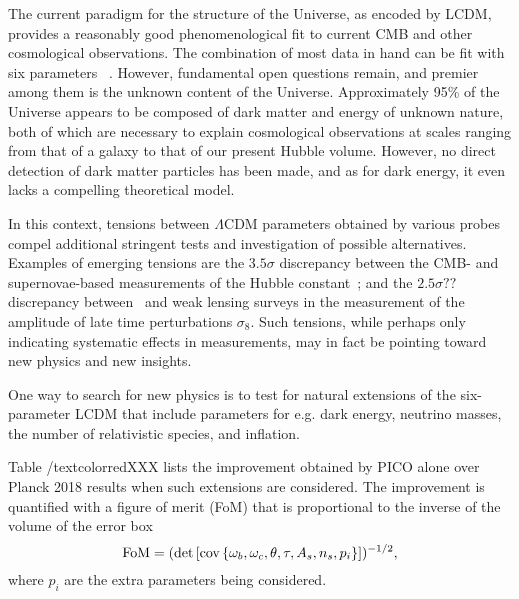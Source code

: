 \documentclass[PICOReport.tex]{subfiles}
\begin{document}

The current paradigm for the structure of the Universe, as encoded by \ac{LCDM}, provides a reasonably good phenomenological fit to current CMB and other cosmological observations. The combination of most data in hand can be fit with six parameters ~\citep{??}. However, fundamental open questions remain, and premier among them is the unknown content of the Universe. Approximately 95\% of the Universe appears to be composed of dark matter and energy of unknown nature, both of which are necessary to explain cosmological observations at scales ranging from that of a galaxy to that of our present Hubble volume. However, no direct detection of dark matter particles has been made, and as for dark energy, it even lacks a compelling theoretical model.

In this context, tensions between $\Lambda$CDM parameters obtained by various probes compel additional stringent tests and investigation of possible alternatives. Examples of emerging tensions are the $3.5\sigma$  discrepancy between the CMB- and supernovae-based measurements of the Hubble constant~\citep{??}; and the $2.5\sigma??$  discrepancy between \planck\ and weak lensing surveys in the  measurement of the amplitude of late time perturbations $\sigma_8$. Such tensions, while perhaps only indicating systematic effects in measurements, may in fact be pointing toward new physics and new insights. 

One way to search for new physics is to test for natural extensions of the six-parameter \ac{LCDM} that include parameters for e.g. dark energy, neutrino masses, the number of relativistic species, and inflation.

 Table /textcolor{red}{XXX} lists the improvement obtained by PICO alone over Planck 2018 results when such extensions are considered. The improvement is quantified with a figure of merit (FoM) that is proportional to the inverse of the volume of the error box
\begin{equation}
{\rm FoM} = (\det \left[ \mbox{cov} \left\{ \omega_b, \omega_c, \theta, \tau, A_s, n_s, p_i \right\} \right])^{-1/2},
\end{equation}
where $p_i$ are the extra parameters being considered.
\end{document}
